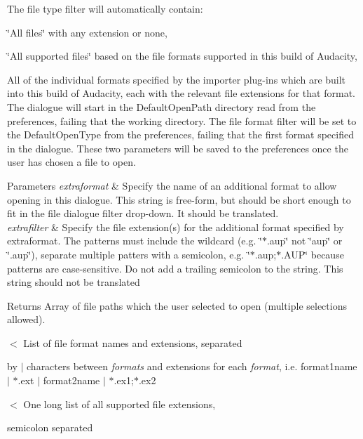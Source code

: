 The file type filter will automatically contain\+:
\begin{DoxyItemize}
\item \char`\"{}\+All files\char`\"{} with any extension or none,
\item \char`\"{}\+All supported files\char`\"{} based on the file formats supported in this build of Audacity,
\item All of the individual formats specified by the importer plug-\/ins which are built into this build of Audacity, each with the relevant file extensions for that format. The dialogue will start in the Default\+Open\+Path directory read from the preferences, failing that the working directory. The file format filter will be set to the Default\+Open\+Type from the preferences, failing that the first format specified in the dialogue. These two parameters will be saved to the preferences once the user has chosen a file to open. 
\begin{DoxyParams}{Parameters}
{\em extraformat} & Specify the name of an additional format to allow opening in this dialogue. This string is free-\/form, but should be short enough to fit in the file dialogue filter drop-\/down. It should be translated. \\
\hline
{\em extrafilter} & Specify the file extension(s) for the additional format specified by extraformat. The patterns must include the wildcard (e.\+g. \char`\"{}$\ast$.\+aup\char`\"{} not \char`\"{}aup\char`\"{} or \char`\"{}.\+aup\char`\"{}), separate multiple patters with a semicolon, e.\+g. \char`\"{}$\ast$.\+aup;$\ast$.\+A\+U\+P\char`\"{} because patterns are case-\/sensitive. Do not add a trailing semicolon to the string. This string should not be translated \\
\hline
\end{DoxyParams}
\begin{DoxyReturn}{Returns}
Array of file paths which the user selected to open (multiple selections allowed). 
\end{DoxyReturn}

\end{DoxyItemize}$<$ List of file format names and extensions, separated

by $\vert$ characters between {\itshape formats} and extensions for each {\itshape format}, i.\+e. format1name $\vert$ $\ast$.ext $\vert$ format2name $\vert$ $\ast$.ex1;$\ast$.ex2

$<$ One long list of all supported file extensions,

semicolon separated 

